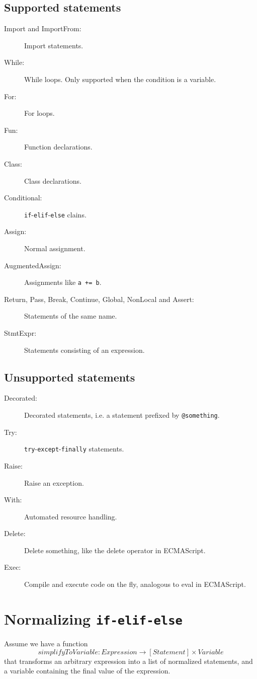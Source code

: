\documentclass[11pt]{report}
\begin{document}
\subsection{Supported statements}
\begin{description}
  \item[Import and ImportFrom:] Import statements.
  \item[While:] While loops. Only supported when the condition is a variable.
  \item[For:] For loops.
  \item[Fun:] Function declarations.
  \item[Class:] Class declarations.
  \item[Conditional:] \verb|if|-\verb|elif|-\verb|else| clains.
  \item[Assign:] Normal assignment.
  \item[AugmentedAssign:] Assignments like \verb|a += b|.
  \item[Return, Pass, Break, Continue, Global, NonLocal and Assert:] Statements of the same name.
  \item[StmtExpr:] Statements consisting of an expression.
\end{description}

\subsection{Unsupported statements}
\begin{description}
  \item[Decorated:] Decorated statements, i.e. a statement prefixed by \verb|@something|.
  \item[Try:] \verb|try|-\verb|except|-\verb|finally| statements.
  \item[Raise:] Raise an exception.
  \item[With:] Automated resource handling.
  \item[Delete:] Delete something, like the delete operator in
    ECMAScript.
  \item[Exec:] Compile and execute code on the fly, analogous to eval
    in ECMAScript.
\end{description}

\section{Normalizing {\tt if-elif-else}}
Assume we have a function $$simplifyToVariable: Expression \rightarrow
[Statement] \times Variable$$ that transforms an arbitrary expression
into a list of normalized statements, and a variable containing the
final value of the expression.
\end{document}
